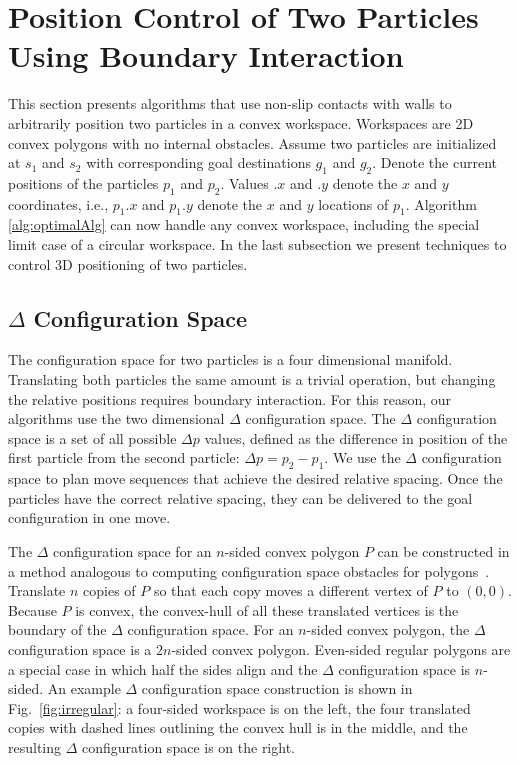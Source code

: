 

\section{Position Control of Two Particles Using Boundary Interaction}\label{sec:PostionControl2Robots}

This section presents algorithms that use non-slip contacts with walls to arbitrarily position two particles in a convex workspace. 
 Workspaces are 2D convex polygons with no internal obstacles. 
 Assume two particles are initialized at $s_1$ and $s_2$ with corresponding goal destinations $g_1$ and $g_2$. 
 Denote the current positions of the particles  $p_1$ and $p_2$. Values $.x$ and $.y$ denote the $x$ and $y$ coordinates, i.e., $p_1.x$ and $p_1.y$ denote the $x$ and $y$ locations of $p_1$. 
 Algorithm \ref{alg:optimalAlg} can now handle any convex workspace, including the special limit case of a circular workspace. In the last subsection we present techniques to control 3D positioning of two particles.





\subsection{$\Delta$ Configuration Space}
The configuration space for two particles is a four dimensional manifold. Translating both particles the same amount is a trivial operation, but changing the relative positions requires boundary interaction. For this reason, our algorithms use the two dimensional $\Delta$ configuration space.
The $\Delta$ configuration space is a set of all possible $\Delta p$ values, defined as the difference in position of the first particle from the second particle: $\Delta p = p_2 - p_1$.
We use the $\Delta$ configuration space to plan move sequences that achieve the desired relative spacing.  Once the particles have the correct relative spacing, they can be delivered to the goal configuration in one move.

The  $\Delta$ configuration space for an $n$-sided convex polygon $P$ can be constructed in a method analogous to computing configuration space obstacles for polygons~\cite{lozano1983spatial}. 
 Translate $n$ copies of $P$  so that each copy moves a different vertex of $P$ to $(0,0)$.
Because $P$ is convex, the convex-hull of all these translated vertices is the boundary of the  $\Delta$ configuration space.
 For an $n$-sided convex polygon, the $\Delta$ configuration space is a $2n$-sided convex polygon.
  Even-sided regular polygons are a special case in which half the sides align and the $\Delta$ configuration space is $n$-sided. 
An example $\Delta$ configuration space construction is shown in Fig.~\ref{fig:irregular}: 
a four-sided workspace is on the left, 
the four translated copies with dashed lines outlining the convex hull is in the middle,
 and the resulting $\Delta$ configuration space is on the right.  


